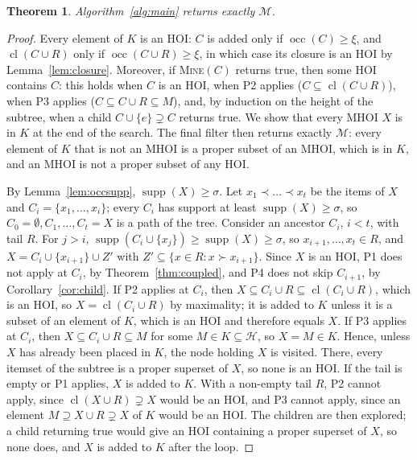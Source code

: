\documentclass[pdflatex,sn-mathphys,Numbered]{sn-jnl}
\theoremstyle{thmstyleone}
\newtheorem{theorem}{Theorem}
\theoremstyle{thmstyletwo}
\theoremstyle{thmstylethree}
\newcommand{\supp}{\operatorname{supp}}
\newcommand{\occ}{\operatorname{occ}}
\newcommand{\cl}{\operatorname{cl}}
\newcommand{\HOI}{\mathcal{H}}
\newcommand{\MHOI}{\mathcal{M}}
\begin{document}
\begin{theorem}\label{thm:correct}
Algorithm~\ref{alg:main} returns exactly $\MHOI$.
\end{theorem}
\begin{proof}
Every element of $K$ is an HOI: $C$ is added only if $\occ(C) \ge \xi$, and $\cl(C \cup R)$ only if $\occ(C \cup R) \ge \xi$, in which case its closure is an HOI by Lemma~\ref{lem:closure}. Moreover, if \textsc{Mine}$(C)$ returns true, then some HOI contains $C$: this holds when $C$ is an HOI, when P2 applies ($C \subseteq \cl(C \cup R)$), when P3 applies ($C \subseteq C \cup R \subseteq M$), and, by induction on the height of the subtree, when a child $C \cup \{e\} \supsetneq C$ returns true. We show that every MHOI $X$ is in $K$ at the end of the search. The final filter then returns exactly $\MHOI$: every element of $K$ that is not an MHOI is a proper subset of an MHOI, which is in $K$, and an MHOI is not a proper subset of any HOI.

By Lemma~\ref{lem:occsupp}, $\supp(X) \ge \sigma$. Let $x_1 \prec \dots \prec x_t$ be the items of $X$ and $C_i = \{x_1, \dots, x_i\}$; every $C_i$ has support at least $\supp(X) \ge \sigma$, so $C_0 = \emptyset, C_1, \dots, C_t = X$ is a path of the tree. Consider an ancestor $C_i$, $i < t$, with tail $R$. For $j > i$, $\supp(C_i \cup \{x_j\}) \ge \supp(X) \ge \sigma$, so $x_{i+1}, \dots, x_t \in R$, and $X = C_i \cup \{x_{i+1}\} \cup Z'$ with $Z' \subseteq \{x \in R : x \succ x_{i+1}\}$. Since $X$ is an HOI, P1 does not apply at $C_i$, by Theorem~\ref{thm:coupled}, and P4 does not skip $C_{i+1}$, by Corollary~\ref{cor:child}.
If P2 applies at $C_i$, then $X \subseteq C_i \cup R \subseteq \cl(C_i \cup R)$, which is an HOI, so $X = \cl(C_i \cup R)$ by maximality; it is added to $K$ unless it is a subset of an element of $K$, which is an HOI and therefore equals $X$.
If P3 applies at $C_i$, then $X \subseteq C_i \cup R \subseteq M$ for some $M \in K \subseteq \HOI$, so $X = M \in K$.
Hence, unless $X$ has already been placed in $K$, the node holding $X$ is visited. There, every itemset of the subtree is a proper superset of $X$, so none is an HOI. If the tail is empty or P1 applies, $X$ is added to $K$. With a non-empty tail $R$, P2 cannot apply, since $\cl(X \cup R) \supsetneq X$ would be an HOI, and P3 cannot apply, since an element $M \supseteq X \cup R \supsetneq X$ of $K$ would be an HOI. The children are then explored; a child returning true would give an HOI containing a proper superset of $X$, so none does, and $X$ is added to $K$ after the loop.
\end{proof}
\end{document}
